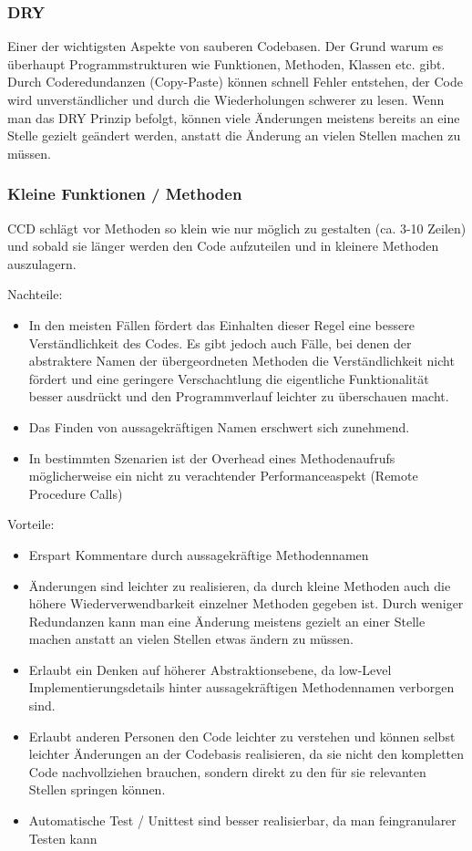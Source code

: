 \subsubsection{DRY}
  
Einer der wichtigsten Aspekte von sauberen Codebasen. Der Grund warum es überhaupt 
Programmstrukturen wie Funktionen, Methoden, Klassen etc. gibt.
Durch Coderedundanzen (Copy-Paste) können schnell Fehler entstehen, der Code
wird unverständlicher und durch die Wiederholungen schwerer zu lesen.
Wenn man das DRY Prinzip befolgt, können viele Änderungen meistens bereits an
eine Stelle gezielt geändert werden, anstatt die Änderung an vielen Stellen
machen zu müssen.

\subsubsection{Kleine Funktionen / Methoden}

CCD schlägt vor Methoden so klein wie nur möglich zu gestalten (ca. 3-10 Zeilen) und sobald 
sie länger werden den Code aufzuteilen und in kleinere Methoden auszulagern.

\bigskip
Nachteile:
\begin{itemize}
\item In den meisten Fällen fördert das Einhalten dieser Regel eine bessere Verständlichkeit
des Codes. Es gibt jedoch auch Fälle, bei denen der abstraktere Namen der übergeordneten Methoden die Verständlichkeit nicht
fördert und eine geringere Verschachtlung die eigentliche Funktionalität besser
ausdrückt und den Programmverlauf leichter zu überschauen macht.
\item Das Finden von aussagekräftigen Namen erschwert sich zunehmend.
\item In bestimmten Szenarien ist der Overhead eines Methodenaufrufs möglicherweise
ein nicht zu verachtender Performanceaspekt (Remote Procedure Calls)
\end{itemize}
\bigskip
Vorteile:
\begin{itemize}
\item Erspart Kommentare durch aussagekräftige Methodennamen
\item Änderungen sind leichter zu realisieren, da durch kleine Methoden auch die
höhere Wiederverwendbarkeit einzelner Methoden gegeben ist. Durch weniger Redundanzen kann man
eine Änderung meistens gezielt an einer Stelle machen anstatt an vielen
Stellen etwas ändern zu müssen.
\item Erlaubt ein Denken auf höherer Abstraktionsebene, da low-Level
Implementierungsdetails hinter aussagekräftigen Methodennamen verborgen sind.
\item Erlaubt anderen Personen den Code leichter zu verstehen und  können selbst
leichter Änderungen an der Codebasis realisieren, da sie nicht den kompletten
Code nachvollziehen brauchen, sondern direkt zu den für sie relevanten Stellen
springen können.
\item Automatische Test / Unittest sind besser realisierbar, da man feingranularer
Testen kann
\end{itemize}

